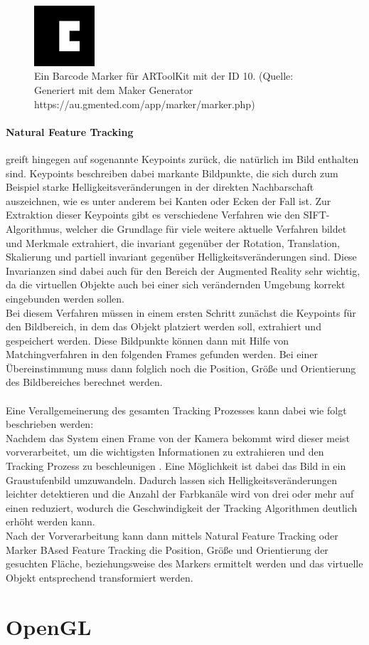 \begin{figure}[h!]
\centering
\includegraphics[width=0.2\textwidth]{Abbildungen/BarcodeMarker3x3-10.png}
\caption[Barcode Marker]{Ein Barcode Marker für ARToolKit mit der ID 10. (Quelle: Generiert mit dem  Maker Generator https://au.gmented.com/app/marker/marker.php)}
\label{fig:barcode-marker}
\end{figure}


\paragraph{Natural Feature Tracking} greift hingegen auf sogenannte Keypoints zurück, die natürlich im Bild enthalten sind. Keypoints beschreiben dabei markante Bildpunkte, die sich durch zum Beispiel starke Helligkeitsveränderungen in der direkten Nachbarschaft auszeichnen, wie es unter anderem bei Kanten oder Ecken der Fall ist. Zur Extraktion dieser Keypoints gibt es verschiedene Verfahren wie den SIFT-Algorithmus,  welcher die Grundlage für viele weitere aktuelle Verfahren bildet und Merkmale extrahiert, die invariant gegenüber der Rotation, Translation, Skalierung und partiell invariant gegenüber Helligkeitsveränderungen sind\citep[S. 345]{nischwitz:bildverarbeitung}. Diese Invarianzen sind dabei auch für den Bereich der Augmented Reality sehr wichtig, da die virtuellen Objekte auch bei einer sich verändernden Umgebung korrekt eingebunden werden sollen.\\
Bei diesem Verfahren müssen in einem ersten Schritt zunächst die Keypoints für den Bildbereich, in dem das Objekt platziert werden soll, extrahiert und gespeichert werden. Diese Bildpunkte können dann mit Hilfe von Matchingverfahren in den folgenden Frames gefunden werden. Bei einer Übereinstimmung muss dann folglich noch die Position, Größe und Orientierung des Bildbereiches berechnet werden. \\
\\
Eine Verallgemeinerung des gesamten Tracking Prozesses kann dabei wie folgt beschrieben werden:\\
Nachdem das System einen Frame von der Kamera bekommt wird dieser meist vorverarbeitet, um die wichtigsten Informationen zu extrahieren und den Tracking Prozess zu beschleunigen \citep[S. 5]{cukovic:marker-vs-natural}. Eine Möglichkeit ist dabei das Bild in ein Graustufenbild umzuwandeln. Dadurch lassen sich Helligkeitsveränderungen leichter detektieren und die Anzahl der Farbkanäle wird von drei oder mehr auf einen reduziert, wodurch die Geschwindigkeit der Tracking Algorithmen deutlich erhöht werden kann.\\
Nach der Vorverarbeitung kann dann mittels Natural Feature Tracking oder Marker BAsed Feature Tracking die Position, Größe und Orientierung der gesuchten Fläche, beziehungsweise des Markers ermittelt werden und das virtuelle Objekt entsprechend transformiert werden.



\section{OpenGL}\label{OpenGL}